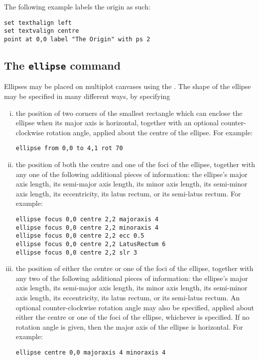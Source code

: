 The following example labels the origin as such:
\begin{verbatim}
set texthalign left
set textvalign centre
point at 0,0 label "The Origin" with ps 2
\end{verbatim}

\subsection{The {\tt ellipse} command}
\label{sec:ellipse}

Ellipses may be placed on multiplot canvases using the . The
shape of the ellipse may be specified in many different ways, by specifying

\begin{enumerate}[(i)]
\item the position of two corners of the smallest rectangle which can enclose
the ellipse when its major axis is horizontal, together with an optional
counter-clockwise rotation angle, applied about the centre of the ellipse.
For example:

\begin{verbatim}
ellipse from 0,0 to 4,1 rot 70
\end{verbatim}

\item the position of both the centre and one of the foci of the ellipse,
together with any one of the following additional pieces of information: the
ellipse's major axis length, its semi-major axis length, its minor axis length,
its semi-minor axis length, its eccentricity, its latus rectum, or its
semi-latus rectum.  For example:

\begin{verbatim}
ellipse focus 0,0 centre 2,2 majoraxis 4
ellipse focus 0,0 centre 2,2 minoraxis 4
ellipse focus 0,0 centre 2,2 ecc 0.5
ellipse focus 0,0 centre 2,2 LatusRectum 6
ellipse focus 0,0 centre 2,2 slr 3
\end{verbatim}

\item the position of either the centre or one of the foci of the ellipse,
together with any two of the following additional pieces of information: the
ellipse's major axis length, its semi-major axis length, its minor axis length,
its semi-minor axis length, its eccentricity, its latus rectum, or its
semi-latus rectum. An optional counter-clockwise rotation angle may also be
specified, applied about either the centre or one of the foci of the ellipse,
whichever is specified. If no rotation angle is given, then the major axis of
the ellipse is horizontal.  For example:

\begin{verbatim}
ellipse centre 0,0 majoraxis 4 minoraxis 4
\end{verbatim}
\end{enumerate}

